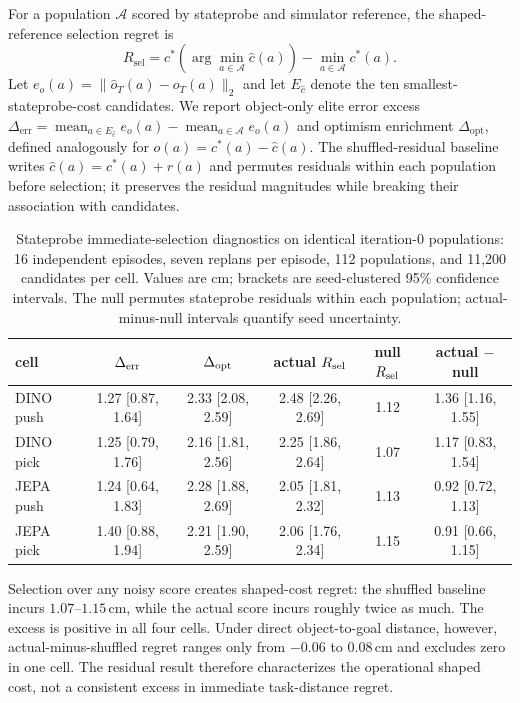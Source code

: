\documentclass[10pt]{article}
\begin{document}
For a population $\mathcal{A}$ scored by stateprobe and simulator reference,
the shaped-reference selection regret is
\begin{equation}
 R_{\mathrm{sel}} =
 c^*\!\left(\arg\min_{a\in\mathcal{A}}\hat c(a)\right)
 - \min_{a\in\mathcal{A}} c^*(a).
\end{equation}
Let $e_o(a)=\|\hat o_T(a)-o_T(a)\|_2$ and let $E_{\hat c}$ denote the ten
smallest-stateprobe-cost candidates. We report object-only elite error excess
$\Delta_{\mathrm{err}}=\operatorname{mean}_{a\in E_{\hat c}}e_o(a)-
\operatorname{mean}_{a\in\mathcal A}e_o(a)$ and optimism enrichment
$\Delta_{\mathrm{opt}}$, defined analogously for
$o(a)=c^*(a)-\hat c(a)$. The shuffled-residual baseline writes
$\hat c(a)=c^*(a)+r(a)$ and permutes residuals within each population before
selection; it preserves the residual magnitudes while breaking their association
with candidates.

\begin{table}[ht]
\centering
\footnotesize
\setlength{\tabcolsep}{3pt}
\caption{Stateprobe immediate-selection diagnostics on identical iteration-0
populations: 16 independent episodes, seven replans per episode, 112
populations, and 11,200 candidates per cell. Values are cm; brackets are
seed-clustered 95\% confidence intervals. The null permutes stateprobe residuals
within each population; actual-minus-null intervals quantify seed uncertainty.}
\label{tab:selection}
\begin{tabular}{lccccc}
\toprule
cell & $\Delta_{\rm err}$ & $\Delta_{\rm opt}$ & actual $R_{\rm sel}$ &
null $R_{\rm sel}$ & actual $-$ null \\
\midrule
DINO push & 1.27 [0.87, 1.64] & 2.33 [2.08, 2.59] &
2.48 [2.26, 2.69] & 1.12 & 1.36 [1.16, 1.55] \\
DINO pick & 1.25 [0.79, 1.76] & 2.16 [1.81, 2.56] &
2.25 [1.86, 2.64] & 1.07 & 1.17 [0.83, 1.54] \\
JEPA push & 1.24 [0.64, 1.83] & 2.28 [1.88, 2.69] &
2.05 [1.81, 2.32] & 1.13 & 0.92 [0.72, 1.13] \\
JEPA pick & 1.40 [0.88, 1.94] & 2.21 [1.90, 2.59] &
2.06 [1.76, 2.34] & 1.15 & 0.91 [0.66, 1.15] \\
\bottomrule
\end{tabular}
\end{table}

Selection over any noisy score creates shaped-cost regret: the shuffled
baseline incurs $1.07$--$1.15$\,cm, while the actual score incurs roughly twice
as much. The excess is positive in all four cells. Under direct object-to-goal
distance, however, actual-minus-shuffled regret ranges only from $-0.06$ to
$0.08$\,cm and excludes zero in one cell. The residual result therefore
characterizes the operational shaped cost, not a consistent excess in immediate
task-distance regret.
\end{document}
